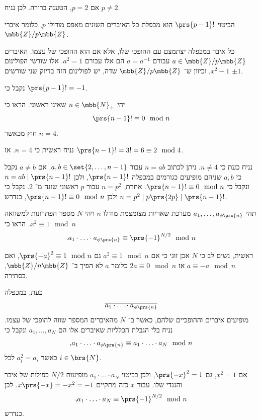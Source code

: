 \documentclass[a4paper,10pt,twoside,openany]{book}
\begin{document}
\begin{solution}
אם
$p = 2$,
הטענה ברורה. לכן נניח
$p \neq 2$.

הביטוי
$\prs{p-1}!$
הוא מכפלת כל האיברים השונים מאפס מודולו
$p$,
כלומר איברי
$\mbb{Z} / p\mbb{Z}$.

כל איבר במכפלה יצתמצם עם ההופכי שלו, אלא אם הוא ההופכי של עצמו.
האיברים
$a \in \mbb{Z} / p\mbb{Z}$
עבורם
$a = a^{-1}$
הם אלו עבורם
$a^2 = 1$.
אלו שורשי הפולינום
$x^2 - 1$,
וכיוון ש־%
$\mbb{Z} / p\mbb{Z}$
שדה, יש לפולינום הזה בדיוק שני שורשים
$\pm 1$.

נקבל כי
$\prs{p-1}! = -1$.
\end{solution}

\begin{exercisechap}
יהי
$n \in \mbb{N}_+$
שאינו ראשוני. הראו כי
\[\prs{n-1}! \equiv 0 \mod{n}\]
חוץ מכאשר
$n = 4$.
\end{exercisechap}

\begin{solution}
נניח ראשית כי
$n = 4$.
אז
$\prs{n-1}! = 3! = 6 \equiv 2 \mod{4}$.

נניח כעת כי
$n \neq 4$.
ניתן לכתוב
$n = ab$
עבור
$a,b \in \set{2, \ldots, n-1}$.
אם
$a \neq b$
נקבל כי
$a,b$
שניהם מופיעים כגורמים במכפלה
$\prs{n-1}!$,
ולכן
$n = ab \mid \prs{n-1}!$
ונקבל כי
$\prs{n-1}! \equiv 0 \mod{n}$.
אחרת,
$n = p^2$
עבור
$p$
ראשוני שונה מ־%
$2$.
נקבל כי
$n = p^2 \mid p \prs{2p} \mid \prs{n-1}!$
ולכן
$\prs{n-1}! \equiv 0 \mod{n}$,
כנדרש.
\end{solution}

\begin{exercisechap}
תהי
$a_1, \ldots, a_{\phi\prs{n}}$
מערכת שאריות מצומצמת מודלו
$n$
ויהי
$N$
מספר הפתרונות למשוואה
$x^2 \equiv 1 \mod{n}$.
הראו כי
\[\text{.} a_1 \cdot \ldots \cdot a_{\phi\prs{n}} \equiv \prs{-1}^{N/2} \mod{n}\]
\end{exercisechap}

\begin{solution}
ראשית, נשים לב כי
$N$
אכן זוגי כי אם
$a^2 \equiv 1 \mod{n}$
גם
$\prs{-a}^2 \equiv 1 \mod{n}$,
ואם
$a \equiv -a \mod{n}$
אז
$2a \equiv 0 \mod{n}$
כלומר
$a$
לא הפיך ב־%
$\mbb{Z} / n\mbb{Z}$,
בסתירה.

כעת, במכפלה
\[\overline{a_1 \cdot \ldots \cdot a_{\phi\prs{n}}}\]
מופיעים איברים וההופכיים שלהם, כאשר ב־%
$N$
מהאיברים המספר שווה להופכי של עצמו.
נניח בלי הגבלת הכלליות שאיברים אלו הם
$a_1, \ldots, a_N$
ונקבל כי
\[\text{,} a_1 \cdot \ldots \cdot a_{\phi\prs{n}} \equiv a_1 \cdot \ldots \cdot a_N \mod{n}\]
כאשר
$a_i^2 = a_i$
לכל
$i \in \brs{N}$.

אם
$x^2 = 1$,
גם
$\prs{-x}^2 = 1$,
ולכן בביטוי
$a_1 \cdot \ldots \cdot a_N$
מופיעות
$N/2$
כפולות של איבר והנגדי שלו.
עבור
$x$
כזה מתקיים
$x \prs{-x} = -x^2 = -1$.
לכן
\[\text{,} a_1 \cdot \ldots \cdot a_N \equiv \prs{-1}^{N/2} \mod{n}\]
כנדרש.
\end{solution}

\printbibliography
\end{document}
